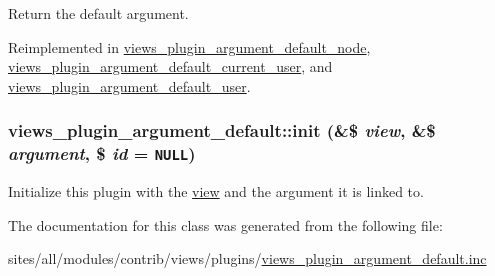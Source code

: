 Return the default argument. 

Reimplemented in \hyperlink{classviews__plugin__argument__default__node_1191e03f5150b371f2fc5911726a4b60}{views\_\-plugin\_\-argument\_\-default\_\-node}, \hyperlink{classviews__plugin__argument__default__current__user_a17e9b1b32a46e9030cf2edd0ed074b8}{views\_\-plugin\_\-argument\_\-default\_\-current\_\-user}, and \hyperlink{classviews__plugin__argument__default__user_f7dc56a3ce8a8cf8ad12595952dc70e6}{views\_\-plugin\_\-argument\_\-default\_\-user}.\hypertarget{classviews__plugin__argument__default_67fac77dc7005112a9ad05bcec9cc40e}{
\subsubsection[{init}]{\setlength{\rightskip}{0pt plus 5cm}views\_\-plugin\_\-argument\_\-default::init (\&\$ {\em view}, \/  \&\$ {\em argument}, \/  \$ {\em id} = {\tt NULL})}}
\label{classviews__plugin__argument__default_67fac77dc7005112a9ad05bcec9cc40e}


Initialize this plugin with the \hyperlink{classview}{view} and the argument it is linked to. 

The documentation for this class was generated from the following file:\begin{CompactItemize}
\item 
sites/all/modules/contrib/views/plugins/\hyperlink{views__plugin__argument__default_8inc}{views\_\-plugin\_\-argument\_\-default.inc}\end{CompactItemize}
